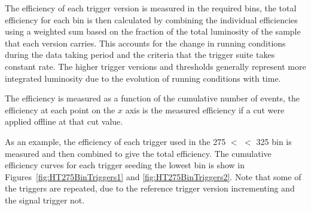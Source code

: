 The efficiency of each trigger version is measured in the required \HT bins, 
the total efficiency for each \HT bin is then calculated by combining the 
individual efficiencies using a weighted sum based on the fraction of 
the total luminosity of the sample that each version carries. This accounts for 
the change in running conditions during the data taking period and the criteria 
that the trigger suite takes constant rate. The higher trigger versions and 
thresholds generally represent more integrated luminosity due to the evolution 
of running conditions with time.

The efficiency is measured as a function of the cumulative number of events, \ie the efficiency at each point on the $x$ axis is the measured efficiency if a cut were applied offline at that cut value.

As an example, the efficiency of each trigger used in the \unit{275}{\GeV} $<$ 
\HT $<$ \unit{325}{\GeV} bin is measured and then combined to give the total 
efficiency. The cumulative efficiency curves for each trigger seeding the 
lowest bin is show in Figures~\ref{fig:HT275BinTriggers1} and 
\ref{fig:HT275BinTriggers2}. Note that some of the triggers are repeated, due 
to the reference trigger version incrementing and the signal trigger not.





